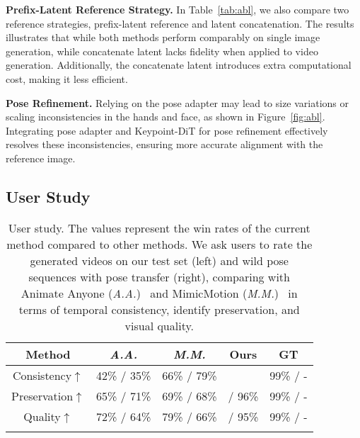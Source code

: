 \noindent\textbf{Prefix-Latent Reference Strategy.} In Table~\ref{tab:abl}, we also compare two reference strategies, prefix-latent reference and latent concatenation. The results illustrates that while both methods perform comparably on single image generation, while concatenate latent lacks fidelity when applied to video generation. Additionally, the concatenate latent introduces extra computational cost, making it less efficient.

\noindent\textbf{Pose Refinement.} Relying on the pose adapter may lead to size variations or scaling inconsistencies in the hands and face, as shown in Figure~\ref{fig:abl}. Integrating pose adapter and Keypoint-DiT for pose refinement effectively resolves these inconsistencies, ensuring more accurate alignment with the reference image.


\subsection{User Study}

\begin{table}[t]
    \centering
    \footnotesize
    \begin{tabular}{c|cccc}
    \Xhline{1pt}
        Method & \textit{A.A.} & \textit{M.M.} & Ours & GT \\ \hline
        Consistency$\uparrow$ & 42\% / 35\% & 66\% / 79\% & \cellcolor[HTML]{D9D9D9}{98\% / 98\%}  & 99\% / - \\
        Preservation$\uparrow$ & 65\% / 71\% & 69\% / 68\% & \cellcolor[HTML]{D9D9D9}{99\%} / 96\% & 99\% / - \\
        Quality$\uparrow$  & 72\% / 64\% & 79\% / 66\% & \cellcolor[HTML]{D9D9D9}{98\%} / 95\% & 99\% / - \\\Xhline{1pt}
    \end{tabular}
    \vspace{-0.1in}
    \caption{User study. The values represent the win rates of the current method compared to other methods. We ask users to rate the generated videos on our test set (left) and wild pose sequences with pose transfer (right), comparing with Animate Anyone (\textit{A.A.})~\cite{hu2024animate} and MimicMotion (\textit{M.M.})~\cite{zhang2024mimicmotion} in terms of temporal consistency, identify preservation, and visual quality.}
    \vspace{-0.2in}
    \label{tab:user}
\end{table}

